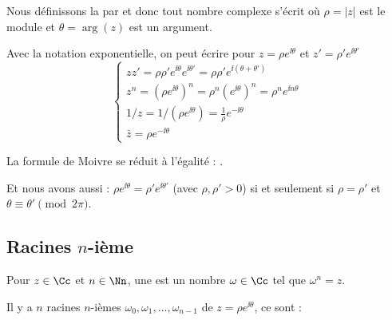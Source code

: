\documentclass[class=report,crop=false]{standalone}
\begin{document}
Nous définissons la  par
 et donc tout nombre complexe s'écrit
o\`u $\rho = \left| z \right|$ est le module et $\theta = \arg (z)$ est un argument.

\bigskip

Avec la notation exponentielle, on peut écrire pour $z = \rho e^{\ii  \theta}$
et $z' = \rho' e^{\ii  \theta'}$
\[ \left\{ \begin{array}{l}
     zz' = \rho \rho' e^{\ii  \theta} e^{\ii  \theta'} = \rho \rho' e^{\ii  (\theta + \theta')}\\
     z^n = \left( \rho e^{\ii  \theta} \right)^n = \rho^n  \left( e^{\ii  \theta}
     \right)^n = \rho^n e^{\ii n \theta}\\
     1 / z = 1 / \left( \rho e^{\ii  \theta} \right) = \frac{1}{\rho} e^{- \ii
     \theta} \\
     \bar{z} = \rho e^{-\ii \theta}
   \end{array} \right. \]

La formule de Moivre se r\'eduit \`a l'égalité : .

Et nous avons aussi : $\rho e^{\ii \theta} = \rho' e^{\ii \theta'}$ (avec $\rho, \rho' > 0$)
si et seulement si $\rho = \rho'$ et $\theta \equiv \theta' \pmod{2\pi}$.


\subsection{Racines $n$-ième}

\begin{definition}
  Pour $z \in \Cc$ et $n \in \Nn$, une  est
  un nombre $\omega \in \Cc$ tel que $\omega^n = z$.
\end{definition}

\begin{proposition}
Il y a $n$ racines $n$-ièmes $\omega_0, \omega_1, \ldots, \omega_{n - 1}$ de $z=\rho e^{\ii  \theta}$, ce sont :
     \vspace{-0.5em}
\end{proposition}
\end{document}
